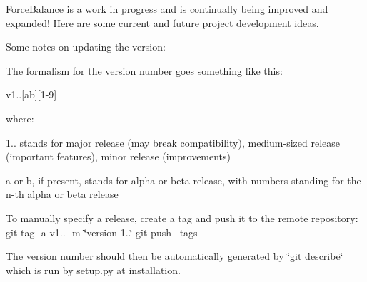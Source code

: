 \hyperlink{namespaceForceBalance}{Force\+Balance} is a work in progress and is continually being improved and expanded! Here are some current and future project development ideas.

Some notes on updating the version\+:

The formalism for the version number goes something like this\+:

v1..\mbox{[}ab\mbox{]}\mbox{[}1-\/9\mbox{]}

where\+: \begin{DoxyItemize}
\item 1.. stands for major release (may break compatibility), medium-\/sized release (important features), minor release (improvements) \item a or b, if present, stands for alpha or beta release, with numbers standing for the n-\/th alpha or beta release\end{DoxyItemize}
To manually specify a release, create a tag and push it to the remote repository\+: git tag -\/a v1.. -\/m \char`\"{}version 1..\char`\"{} git push --tags

The version number should then be automatically generated by \char`\"{}git describe\char`\"{} which is run by setup.\+py at installation.

